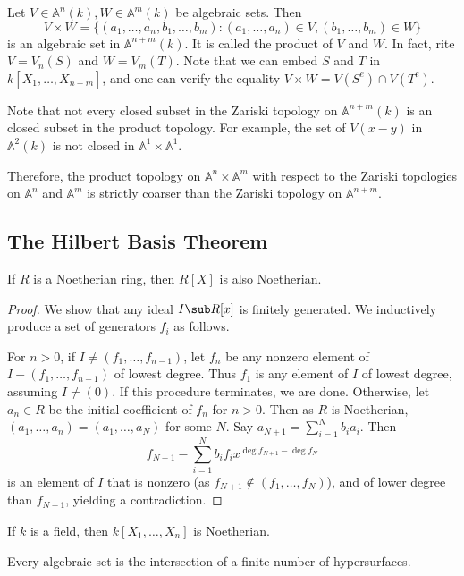 \begin{remark}
Let $V\in\mathbb{A}^n(k),W\in\mathbb{A}^m(k)$ be algebraic sets. Then
\[V\times W=\{(a_1,\dots,a_n,b_1,\dots,b_m):(a_1,\dots,a_n)\in V,(b_1,\dots,b_m)\in W\}\]
is an algebraic set in $\mathbb{A}^{n+m}(k)$. It is called the product of $V$ and $W$. In fact, rite $V=V_n(S)$ and $W=V_m(T)$. Note that we can embed $S$ and $T$ in $k[X_1,\dots,X_{n+m}]$, and one can verify the equality $V\times W=V(S^e)\cap V(T^e)$.\par
Note that not every closed subset in the Zariski topology on $\mathbb{A}^{n+m}(k)$ is an closed subset in the product topology. For example, the set of $V(x-y)$ in $\mathbb{A}^2(k)$ is not closed in $\mathbb{A}^1\times\mathbb{A}^1$.\par
Therefore, the product topology on $\mathbb{A}^n\times\mathbb{A}^m$ with respect to the Zariski topologies on $\mathbb{A}^n$ and $\mathbb{A}^m$ is strictly coarser than the Zariski topology on $\mathbb{A}^{n+m}$.
\end{remark}
\subsection{The Hilbert Basis Theorem}
\begin{theorem}
If $R$ is a Noetherian ring, then $R[X]$ is also Noetherian.
\end{theorem}
\begin{proof}
We show that any ideal $I\sub R[x]$ is finitely generated. We inductively produce a set of generators $f_i$ as follows.\par
For $n>0$, if $I\neq(f_1,\dots,f_{n-1})$, let $f_n$ be any nonzero element of $I-(f_1,\dots,f_{n-1})$ of lowest degree. Thus $f_1$ is any element of $I$ of lowest degree, assuming $I\neq(0)$. If this procedure terminates, we are done. Otherwise, let $a_n\in R$ be the initial coefficient of $f_n$ for $n>0$. Then as $R$ is Noetherian, $(a_1,\dots,a_n)=(a_1,\dots,a_N)$ for some $N$. Say $a_{N+1}=\sum_{i=1}^{N}b_ia_i$. Then
\[f_{N+1}-\sum_{i=1}^{N}b_if_ix^{\deg f_{N+1}-\deg f_N}\]
is an element of $I$ that is nonzero (as $f_{N+1}\notin(f_1,\dots,f_N)$), and of lower degree than $f_{N+1}$, yielding a contradiction.
\end{proof}
\begin{corollary}
If $k$ is a field, then $k[X_1,\dots,X_n]$ is Noetherian.
\end{corollary}
\begin{corollary}
Every algebraic set is the intersection of a finite number of hypersurfaces.
\end{corollary}
